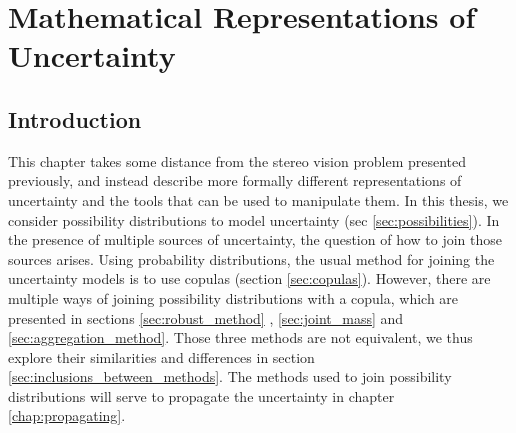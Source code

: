 \chapter{Mathematical Representations of Uncertainty}\label{chap:representation_of_uncertainty}

\section{Introduction}
This chapter takes some distance from the stereo vision problem presented previously, and instead describe more formally different representations of uncertainty and the tools that can be used to manipulate them. In this thesis, we consider possibility distributions to model uncertainty (sec \ref{sec:possibilities}). In the presence of multiple sources of uncertainty, the question of how to join those sources arises. Using probability distributions, the usual method for joining the uncertainty models is to use copulas (section \ref{sec:copulas}). However, there are multiple ways of joining possibility distributions with a copula, which are presented in sections \ref{sec:robust_method} , \ref{sec:joint_mass} and \ref{sec:aggregation_method}. Those three methods are not equivalent, we thus explore their similarities and differences in section \ref{sec:inclusions_between_methods}. The methods used to join possibility distributions will serve to propagate the uncertainty in chapter \ref{chap:propagating}. 

